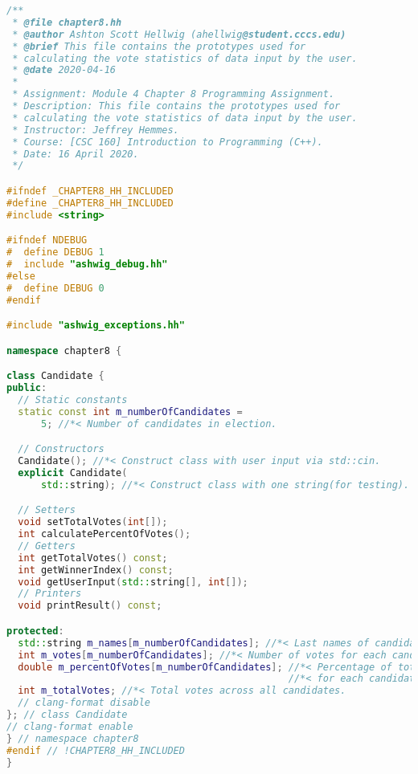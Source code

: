\documentclass[12pt]{report}
\theoremstyle{definition}
\theoremstyle{plain}
\theoremstyle{plain}
\begin{document}
            \begin{lstlisting}[language=c++,caption={Ashton`s clang-format Result -- Macros}]
/**
 * @file chapter8.hh
 * @author Ashton Scott Hellwig (ahellwig@student.cccs.edu)
 * @brief This file contains the prototypes used for
 * calculating the vote statistics of data input by the user.
 * @date 2020-04-16
 *
 * Assignment: Module 4 Chapter 8 Programming Assignment.
 * Description: This file contains the prototypes used for
 * calculating the vote statistics of data input by the user.
 * Instructor: Jeffrey Hemmes.
 * Course: [CSC 160] Introduction to Programming (C++).
 * Date: 16 April 2020.
 */

#ifndef _CHAPTER8_HH_INCLUDED
#define _CHAPTER8_HH_INCLUDED
#include <string>

#ifndef NDEBUG
#  define DEBUG 1
#  include "ashwig_debug.hh"
#else
#  define DEBUG 0
#endif

#include "ashwig_exceptions.hh"

namespace chapter8 {

class Candidate {
public:
  // Static constants
  static const int m_numberOfCandidates =
      5; //*< Number of candidates in election.

  // Constructors
  Candidate(); //*< Construct class with user input via std::cin.
  explicit Candidate(
      std::string); //*< Construct class with one string(for testing).

  // Setters
  void setTotalVotes(int[]);
  int calculatePercentOfVotes();
  // Getters
  int getTotalVotes() const;
  int getWinnerIndex() const;
  void getUserInput(std::string[], int[]);
  // Printers
  void printResult() const;

protected:
  std::string m_names[m_numberOfCandidates]; //*< Last names of candidates.
  int m_votes[m_numberOfCandidates]; //*< Number of votes for each candidate.
  double m_percentOfVotes[m_numberOfCandidates]; //*< Percentage of total votes
                                                 //*< for each candidate.
  int m_totalVotes; //*< Total votes across all candidates.
  // clang-format disable
}; // class Candidate
// clang-format enable
} // namespace chapter8
#endif // !CHAPTER8_HH_INCLUDED
}
\end{lstlisting}
\end{document}
